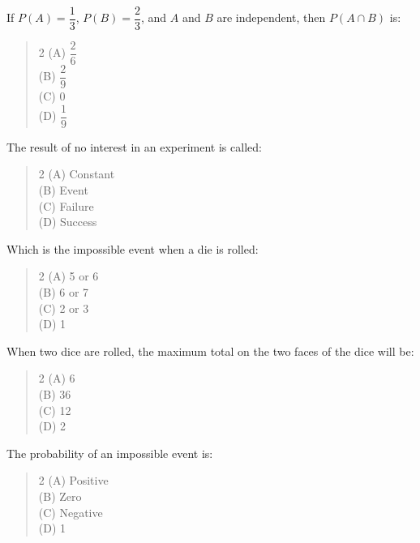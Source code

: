 \documentclass[11pt,a4paper]{article}
\begin{document}
\begin{mcqlist}
\item If $P(A)=\dfrac{1}{3}$, $P(B)=\dfrac{2}{3}$, and $A$ and $B$ are independent, then $P(A\cap B)$ is:
\begin{quote}\begin{multicols}{2}
\noindent (A) $\dfrac{2}{6}$ \\
(B) $\dfrac{2}{9}$ \\
(C) 0 \\
(D) $\dfrac{1}{9}$
\end{multicols}\end{quote}

\item The result of no interest in an experiment is called:
\begin{quote}\begin{multicols}{2}
\noindent (A) Constant \\
(B) Event \\
(C) Failure \\
(D) Success
\end{multicols}\end{quote}

\item Which is the impossible event when a die is rolled:
\begin{quote}\begin{multicols}{2}
\noindent (A) 5 or 6 \\
(B) 6 or 7 \\
(C) 2 or 3 \\
(D) 1
\end{multicols}\end{quote}

\item When two dice are rolled, the maximum total on the two faces of the dice will be:
\begin{quote}\begin{multicols}{2}
\noindent (A) 6 \\
(B) 36 \\
(C) 12 \\
(D) 2
\end{multicols}\end{quote}

\item The probability of an impossible event is:
\begin{quote}\begin{multicols}{2}
\noindent (A) Positive \\
(B) Zero \\
(C) Negative \\
(D) 1
\end{multicols}\end{quote}


\end{mcqlist}
\end{document}
